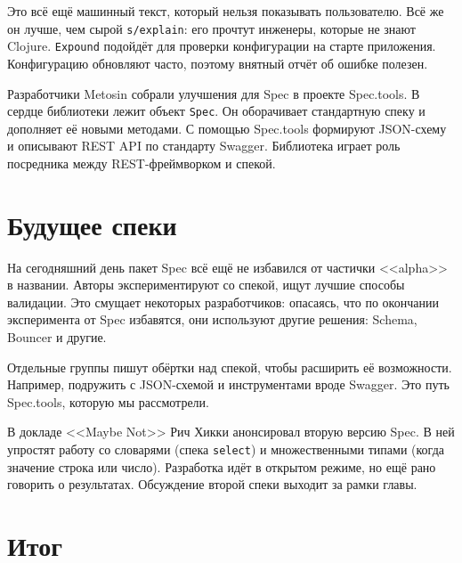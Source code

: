 
Это всё ещё машинный текст, который нельзя показывать пользователю. Всё же
он лучше, чем сырой \verb|s/explain|: его прочтут инженеры, которые не знают
Clojure. \verb|Expound| подойдёт для проверки конфигурации на старте
приложения. Конфигурацию обновляют часто, поэтому внятный отчёт об ошибке
полезен.


Разработчики Metosin собрали улучшения для Spec в проекте
Spec.tools. В сердце библиотеки
лежит объект \verb|Spec|. Он оборачивает стандартную спеку и дополняет её
новыми методами. С помощью Spec.tools формируют JSON-схему и описывают REST
API по стандарту Swagger. Библиотека играет роль посредника между
REST-фреймворком и спекой.

\section{Будущее спеки}


На сегодняшний день пакет Spec всё ещё не избавился от частички
<<alpha>> в названии. Авторы экспериментируют со спекой, ищут лучшие способы
валидации. Это смущает некоторых разработчиков: опасаясь, что по окончании
эксперимента от Spec избавятся, они используют другие решения:
Schema,
Bouncer и другие.

Отдельные группы пишут обёртки над спекой, чтобы расширить её
возможности. Например, подружить с JSON-схемой и инструментами вроде
Swagger. Это путь Spec.tools, которую мы рассмотрели.


В докладе <<Maybe Not>> Рич
Хикки анонсировал вторую версию Spec. В ней упростят работу со словарями (спека
\verb|select|) и множественными типами (когда значение строка или
число). Разработка идёт в открытом режиме, но ещё рано говорить о
результатах. Обсуждение второй спеки выходит за рамки главы.

\section{Итог}

